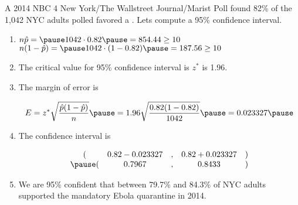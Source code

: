 \documentclass{beamer}
\begin{document}
\begin{frame}
  \begin{example}
    A 2014 NBC 4 New York/The Wallstreet Journal/Marist Poll found 82\% of the 1,042 NYC adults polled favored a . Lets compute a 95\% confidence interval.\pause

    \vspace{1mm}
    \begin{enumerate}
    \item $n\hat{p}=\pause 1042\cdot 0.82\pause = 854.44\geq 10$\\\pause $n(1-\hat{p})=\pause1042\cdot(1-0.82)\pause=187.56\geq 10$\pause
    \item The critical value for 95\% confidence interval is $z^{*}$ is 1.96.\pause
    \item The margin of error is

      \vspace{-3mm}
      \begin{equation*}
        E=z^{*}\sqrt{\dfrac{\hat{p}(1-\hat{p})}{n}}\pause
        =1.96\sqrt{\dfrac{0.82(1-0.82)}{1042}}\pause
        = 0.023327\pause
      \end{equation*}
      \vspace{-5mm}
    \item The confidence interval is

      \vspace{-3mm}
      \begin{equation*}
        \begin{matrix}
          ( & 0.82 - 0.023327 &,& 0.82 + 0.023327 & ) \\\pause
          ( & 0.7967 &,& 0.8433 & ) \\
        \end{matrix}
      \end{equation*}

      \vspace{-2mm}\pause
      \item We are 95\% confident that between 79.7\% and 84.3\% of NYC adults supported the mandatory Ebola quarantine in 2014.
    \end{enumerate}
  \end{example}
\end{frame}
\end{document}
